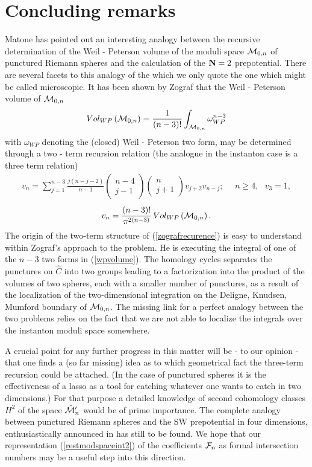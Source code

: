 \documentclass[a4paper,12pt]{article}
\begin{document}
\section{Concluding remarks}

Matone \cite{matone3} has pointed out an interesting analogy between 
the recursive determination of the Weil - Peterson volume of the 
moduli space ${\cal M}_{0,n}$ of punctured Riemann spheres and the 
calculation of the ${\bf N}=2$ prepotential. There are several 
facets to this analogy of the which we only quote the one which 
might be called microscopic. It has been shown by Zograf \cite{zograf} 
that the Weil - Peterson volume of ${\cal M}_{0,n}$ 
\begin{equation}
Vol_{WP}\left({\cal M}_{0,n}\right)=\frac{1}{(n-3)!}\int_{{\cal M}_{0,n}}
\omega_{WP}^{n-3}
\label{wpvolume}
\end{equation}   
with $\omega_{WP}$ denoting the (closed) Weil - Peterson two form, 
may be determined through a two - term recursion relation (the analogue 
in the instanton case is a three term relation) 
\begin{eqnarray}
v_n=\sum_{j=1}^{n-3}\frac{j(n-j-2)}{n-1}
\left(
\begin{array}{c}
n-4 \\
j-1
\end{array}
\right)
\left(
\begin{array}{c}
n \\
j+1
\end{array}
\right)
v_{j+2}v_{n-j}; \, \, \, \, \, \, \, \, n\geq 4, \, \, \, \, v_3=1,
\label{zografrecurence}
\end{eqnarray} 
\[
v_n =\frac{(n-3)!}{\pi^{2(n-3)}} \,Vol_{WP}\left({\cal M}_{0,n}\right).
\]
The origin of the two-term structure of (\ref{zografrecurence}) 
is easy to understand within Zograf's approach to the problem. He 
is executing the integral of one of the $n-3$ two forms in 
(\ref{wpvolume}). The homology cycles separates the punctures 
on $\hat{C}$ into two groups leading 
to a factorization into the product of the volumes of two spheres, 
each with a smaller number of punctures, as a result of the 
localization of the two-dimensional integration on the Deligne, 
Knudsen, Mumford boundary \cite{deligne} of ${\cal M}_{0,n}$. 
The missing link for a perfect analogy between the two problems 
relies on the fact that we are not able to localize the integrals 
over the instanton moduli space somewhere. 

A crucial 
point for any further progress in this matter will be - to our 
opinion - that one finds a (so far missing) idea as to which geometrical 
fact the three-term recursion could be attached. (In the case 
of punctured spheres it is the effectiveness of a lasso as 
a tool for catching whatever one wants to catch in two dimensions.)
For that purpose a detailed knowledge of second cohomology classes 
$H^2$ of the space $\hat{{\cal M}}'_n$ would be of prime importance. 
The complete analogy between punctured Riemann spheres and 
the SW prepotential in four dimensions, enthusiastically announced 
in \cite{matone1} has still to be found. We hope that our 
representation (\ref{restmodspaceint2}) of the coefficients 
${\cal F}_n$ as formal 
intersection numbers may be a useful step into this direction.   
\end{document}
